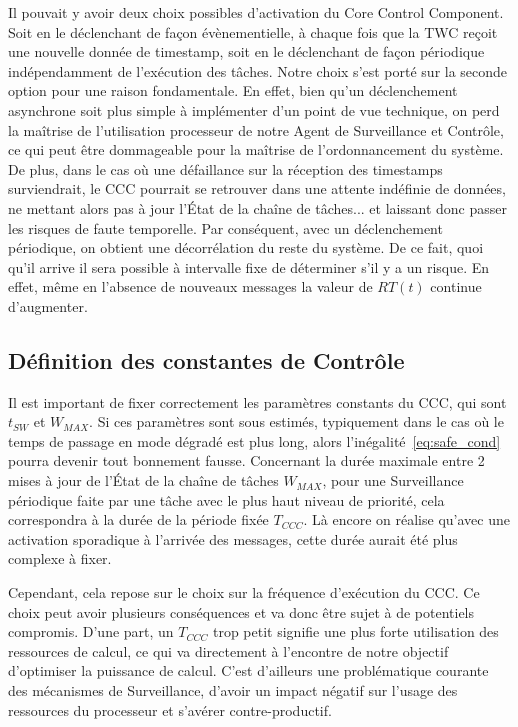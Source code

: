 \documentclass[french, a4paper, 11pt, twoside, pdftex]{StyleThese}
\begin{document}
        Il pouvait y avoir deux choix possibles d'activation du Core Control Component. Soit en le déclenchant de façon évènementielle, à chaque fois que la TWC reçoit une nouvelle donnée de timestamp, soit en le déclenchant de façon périodique indépendamment de l'exécution des tâches. Notre choix s'est porté sur la seconde option pour une raison fondamentale. En effet, bien qu'un déclenchement asynchrone soit plus simple à implémenter d'un point de vue technique, on perd la maîtrise de l'utilisation processeur de notre Agent de Surveillance et Contrôle, ce qui peut être dommageable pour la maîtrise de l'ordonnancement du système. De plus, dans le cas où une défaillance sur la réception des timestamps surviendrait, le CCC pourrait se retrouver dans une attente indéfinie de données, ne mettant alors pas à jour l'État de la chaîne de tâches... et laissant donc passer les risques de faute temporelle. Par conséquent, avec un déclenchement périodique, on obtient une décorrélation du reste du système. De ce fait, quoi qu'il arrive il sera possible à intervalle fixe de déterminer s'il y a un risque. En effet, même en l'absence de nouveaux messages la valeur de $RT(t)$ continue d'augmenter.
        
        
		\subsection{Définition des constantes de Contrôle}
        Il est important de fixer correctement les paramètres constants du CCC, qui sont $t_{SW}$ et $W_{MAX}$.
        Si ces paramètres sont sous estimés, typiquement dans le cas où le temps de passage en mode dégradé est plus long, alors l'inégalité~\ref{eq:safe_cond} pourra devenir tout bonnement fausse. 
        Concernant la durée maximale entre 2 mises à jour de l'État de la chaîne de tâches $W_{MAX}$, pour une Surveillance périodique faite par une tâche avec le plus haut niveau de priorité, cela correspondra à la durée de la période fixée $T_{CCC}$. Là encore on réalise qu'avec une activation sporadique à l'arrivée des messages, cette durée aurait été plus complexe à fixer. 
        
        Cependant, cela repose sur le choix sur la fréquence d'exécution du CCC. Ce choix peut avoir plusieurs conséquences et va donc être sujet à de potentiels compromis. D'une part, un $T_{CCC}$ trop petit signifie une plus forte utilisation des ressources de calcul, ce qui va directement à l'encontre de notre objectif d'optimiser la puissance de calcul. C'est d'ailleurs une problématique courante des mécanismes de Surveillance, d'avoir un impact négatif sur l'usage des ressources du processeur et s'avérer contre-productif.
        
\end{document}
